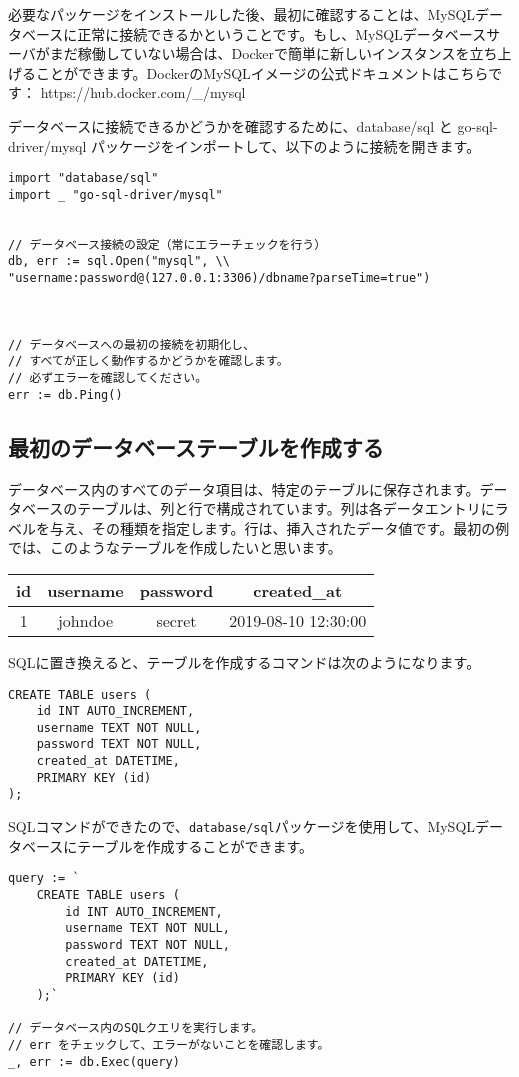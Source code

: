 必要なパッケージをインストールした後、最初に確認することは、MySQLデータベースに正常に接続できるかということです。もし、MySQLデータベースサーバがまだ稼働していない場合は、Dockerで簡単に新しいインスタンスを立ち上げることができます。DockerのMySQLイメージの公式ドキュメントはこちらです： https://hub.docker.com/\_/mysql

データベースに接続できるかどうかを確認するために、database/sql と go-sql-driver/mysql パッケージをインポートして、以下のように接続を開きます。


\begin{lstlisting}[numbers=none]
import "database/sql"
import _ "go-sql-driver/mysql"


// データベース接続の設定（常にエラーチェックを行う）
db, err := sql.Open("mysql", \\
"username:password@(127.0.0.1:3306)/dbname?parseTime=true")



// データベースへの最初の接続を初期化し、
// すべてが正しく動作するかどうかを確認します。
// 必ずエラーを確認してください。
err := db.Ping()
\end{lstlisting}


\subsection{最初のデータベーステーブルを作成する}

データベース内のすべてのデータ項目は、特定のテーブルに保存されます。データベースのテーブルは、列と行で構成されています。列は各データエントリにラベルを与え、その種類を指定します。行は、挿入されたデータ値です。最初の例では、このようなテーブルを作成したいと思います。

\begin{tabular}{|c|c|c|c|}\hline
    id & username & password & created\_at\\ \hline
    1 & johndoe & secret & 2019-08-10 12:30:00\\ \hline
\end{tabular}

SQLに置き換えると、テーブルを作成するコマンドは次のようになります。


\begin{lstlisting}[numbers=none]
CREATE TABLE users (
    id INT AUTO_INCREMENT,
    username TEXT NOT NULL,
    password TEXT NOT NULL,
    created_at DATETIME,
    PRIMARY KEY (id)
);
\end{lstlisting}

SQLコマンドができたので、\texttt{database/sql}パッケージを使用して、MySQLデータベースにテーブルを作成することができます。


\begin{lstlisting}[numbers=none]
    query := `
    CREATE TABLE users (
        id INT AUTO_INCREMENT,
        username TEXT NOT NULL,
        password TEXT NOT NULL,
        created_at DATETIME,
        PRIMARY KEY (id)
    );`

// データベース内のSQLクエリを実行します。
// err をチェックして、エラーがないことを確認します。
_, err := db.Exec(query)
\end{lstlisting}


